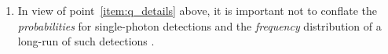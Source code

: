 \documentclass[\ifafour a4paper,12pt,\else a5paper,10pt,\fi%
onecolumn,oneside,article,%
british%
]{memoir}
\newcommand*{\defquote}[1]{`\,#1\,'}
\theoremstyle{remark}
\theoremstyle{innote}
\newcommand*{\citep}{\parencites}%
\newcommand*{\ibid}{\unspace\addtocounter{footnote}{-1}\footnotemark{}}
\newcommand*{\amp}{\&}
\renewcommand*{\|}[1][]{\nonscript\,#1\vert\nonscript\;\mathopen{}}
\newcommand*{\sect}{\S}%
\newcommand*{\eqn}{eq.}%
\newcommand*{\eg}{{e.g.}}
\begin{document}
\begin{enumerate}[label=(\textbf{\roman*})]
\item\label{item:q_prob_freq} In view of point~\ref{item:q_details} above,
  it is important not to conflate the \emph{probabilities} for
  single-photon detections and the \emph{frequency} distribution of a
  long-run of such detections \citep[\sect~2, seem to conflate the
  two]{gelmanetal2020}.
%  


%
\end{enumerate}
\end{document}
